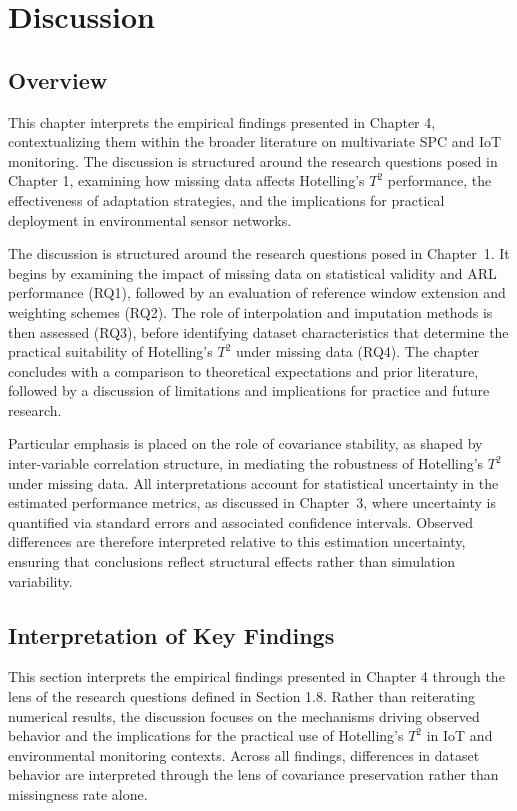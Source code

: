 \clearpage
\section{Discussion}

\subsection{Overview}

This chapter interprets the empirical findings presented in Chapter 4, contextualizing them within the broader literature on multivariate \ac{SPC} and \ac{IoT} monitoring. The discussion is structured around the research questions posed in Chapter 1, examining how missing data affects Hotelling's $T^2$ performance, the effectiveness of adaptation strategies, and the implications for practical deployment in environmental sensor networks.

The discussion is structured around the research questions posed in Chapter~1. It begins by examining the impact of missing data on statistical validity and \ac{ARL} performance (RQ1), followed by an evaluation of reference window extension and weighting schemes (RQ2). The role of interpolation and imputation methods is then assessed (RQ3), before identifying dataset characteristics that determine the practical suitability of Hotelling’s $T^2$ under missing data (RQ4). The chapter concludes with a comparison to theoretical expectations and prior literature, followed by a discussion of limitations and implications for practice and future research.

Particular emphasis is placed on the role of covariance stability, as shaped by inter-variable correlation structure, in mediating the robustness of Hotelling’s $T^2$ under missing data.
All interpretations account for statistical uncertainty in the estimated performance metrics, as discussed in Chapter~3, where uncertainty is quantified via standard errors and associated confidence intervals. Observed differences are therefore interpreted relative to this estimation uncertainty, ensuring that conclusions reflect structural effects rather than simulation variability.

\subsection{Interpretation of Key Findings}

This section interprets the empirical findings presented in Chapter 4 through the lens of the research questions defined in Section 1.8. Rather than reiterating numerical results, the discussion focuses on the mechanisms driving observed behavior and the implications for the practical use of Hotelling’s $T^2$ in IoT and environmental monitoring contexts.
Across all findings, differences in dataset behavior are interpreted through the lens of covariance preservation rather than missingness rate alone.


